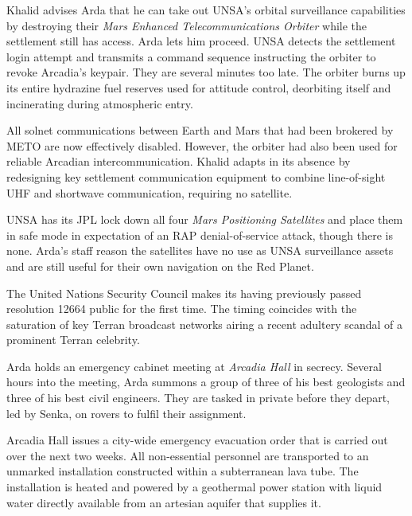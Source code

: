 Khalid advises Arda that he can take out UNSA's orbital surveillance capabilities by destroying their {\it Mars Enhanced Telecommunications Orbiter} while the settlement still has access. Arda lets him proceed. UNSA detects the settlement login attempt and transmits a command sequence instructing the orbiter to revoke Arcadia's keypair. They are several minutes too late. The orbiter burns up its entire hydrazine fuel reserves used for attitude control, deorbiting itself and incinerating during atmospheric entry.

All solnet communications between Earth and Mars that had been brokered by METO are now effectively disabled. However, the orbiter had also been used for reliable Arcadian intercommunication. Khalid adapts in its absence by redesigning key settlement communication equipment to combine line-of-sight UHF and shortwave communication, requiring no satellite.

UNSA has its JPL lock down all four {\it Mars Positioning Satellites} and place them in safe mode in expectation of an RAP denial-of-service attack, though there is none. Arda's staff reason the satellites have no use as UNSA surveillance assets and are still useful for their own navigation on the Red Planet.
\StopTimelineDate

The United Nations Security Council makes its having previously passed resolution 12664 public for the first time. The timing coincides with the saturation of key Terran broadcast networks airing a recent adultery scandal of a prominent Terran celebrity.
\StopTimelineDate

Arda holds an emergency cabinet meeting at {\it Arcadia Hall} in secrecy. Several hours into the meeting, Arda summons a group of three of his best geologists and three of his best civil engineers. They are tasked in private before they depart, led by Senka, on rovers to fulfil their assignment.
\StopTimelineDate

Arcadia Hall issues a city-wide emergency evacuation order that is carried out over the next two weeks. All non-essential personnel are transported to an unmarked installation constructed within a subterranean lava tube. The installation is heated and powered by a geothermal power station with liquid water directly available from an artesian aquifer that supplies it.
\StopTimelineDate

